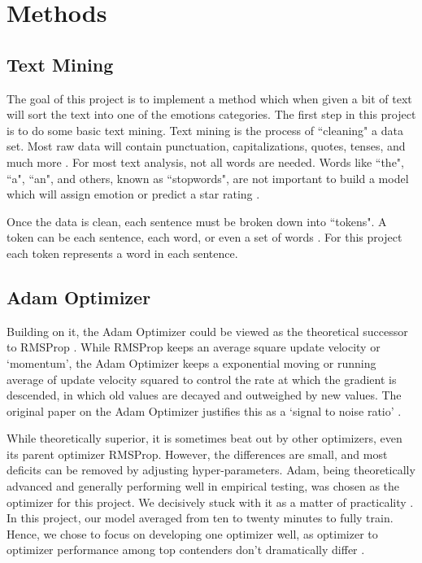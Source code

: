 \documentclass[titlepage,letterpaper]{article}
\begin{document}
\section{Methods}

\subsection{Text Mining}
The goal of this project is to implement a method which when given a bit of text will sort the text into one of the emotions categories. The first step in this project is to do some basic text mining. Text mining is the process of ``cleaning" a data set.  Most raw data will contain punctuation, capitalizations, quotes, tenses, and much more \cite{TextMining}. For most text analysis, not all words are needed. Words like ``the", ``a", ``an", and others, known as ``stopwords", are not important to build a model which will assign emotion or predict a star rating \cite{TextMining}. 

Once the data is clean, each sentence must be broken down into ``tokens". A token can be each sentence, each word, or even a set of words \cite{TextMining}. For this project each token represents a word in each sentence. 

\subsection{Adam Optimizer}

Building on it, the Adam Optimizer could be viewed as the theoretical successor to RMSProp \cite{adam}. While RMSProp keeps an average square update velocity or `momentum'\cite{rmsprop}, the Adam Optimizer keeps a exponential moving or running average of update velocity squared to control the rate at which the gradient is descended, in which old values are decayed and outweighed by new values. The original paper on the Adam Optimizer justifies this as a `signal to noise ratio' \cite{adam}.

While theoretically superior, it is sometimes beat out by other optimizers, even its parent optimizer RMSProp. However, the differences are small, and most deficits can be removed by adjusting hyper-parameters. Adam, being theoretically advanced and generally performing well in empirical testing, was chosen as the optimizer for this project. We decisively stuck with it as a matter of practicality \cite{learn}. In this project, our model averaged from ten to twenty minutes to fully train. Hence, we chose to focus on developing one optimizer well, as optimizer to optimizer performance among top contenders don't dramatically differ \cite{learn}.
\end{document}

